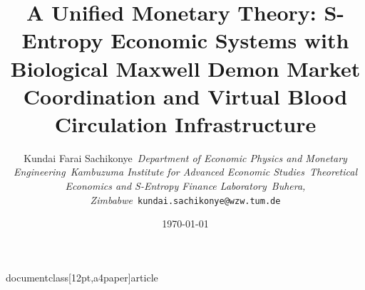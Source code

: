 documentclass[12pt,a4paper]{article}
\usepackage[utf8]{inputenc}
\usepackage[T1]{fontenc}
\usepackage{amsmath,amssymb,amsfonts}
\usepackage{amsthm}
\usepackage{graphicx}
\usepackage{float}
\usepackage{tikz}
\usepackage{pgfplots}
\pgfplotsset{compat=1.18}
\usepackage{booktabs}
\usepackage{multirow}
\usepackage{array}
\usepackage{siunitx}
\usepackage{physics}
\usepackage{cite}
\usepackage{url}
\usepackage{hyperref}
\usepackage{geometry}
\usepackage{fancyhdr}
\usepackage{subcaption}
\usepackage{algorithm}
\usepackage{algpseudocode}

\geometry{margin=1in}
\setlength{\headheight}{14.5pt}
\pagestyle{fancy}
\fancyhf{}
\rhead{\thepage}

\newtheorem{theorem}{Theorem}
\newtheorem{lemma}{Lemma}
\newtheorem{definition}{Definition}
\newtheorem{corollary}{Corollary}
\newtheorem{proposition}{Proposition}

\title{\textbf{A Unified Monetary Theory: S-Entropy Economic Systems with Biological Maxwell Demon Market Coordination and Virtual Blood Circulation Infrastructure}}

\author{
Kundai Farai Sachikonye\
\textit{Department of Economic Physics and Monetary Engineering}\
\textit{Kambuzuma Institute for Advanced Economic Studies}\
\textit{Theoretical Economics and S-Entropy Finance Laboratory}\
\textit{Buhera, Zimbabwe}\
\texttt{kundai.sachikonye@wzw.tum.de}
}

\date{\today}



\maketitle


